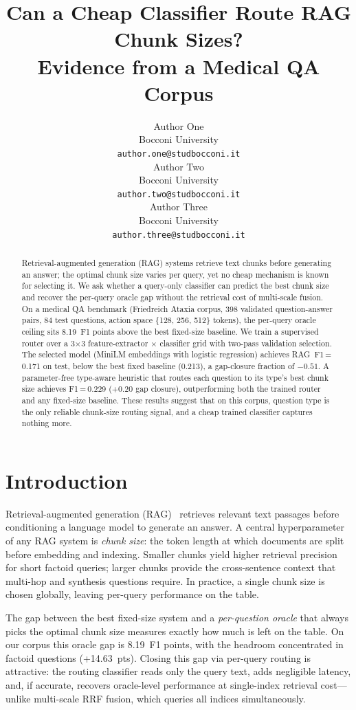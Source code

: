 \documentclass{article}
\title{Can a Cheap Classifier Route RAG Chunk Sizes?\\
       Evidence from a Medical QA Corpus}
\author{%
  Author One \\
  Bocconi University \\
  \texttt{author.one@studbocconi.it} \\
  \And
  Author Two \\
  Bocconi University \\
  \texttt{author.two@studbocconi.it} \\
  \And
  Author Three \\
  Bocconi University \\
  \texttt{author.three@studbocconi.it} \\
}
\begin{document}
\maketitle

\begin{abstract}
Retrieval-augmented generation (RAG) systems retrieve text chunks before
generating an answer; the optimal chunk size varies per query, yet no cheap
mechanism is known for selecting it. We ask whether a query-only classifier
can predict the best chunk size and recover the per-query oracle gap without
the retrieval cost of multi-scale fusion. On a medical QA benchmark
(Friedreich Ataxia corpus, 398 validated question-answer pairs, 84 test
questions, action space \{128, 256, 512\} tokens), the per-query oracle
ceiling sits 8.19~F1 points above the best fixed-size baseline. We train a
supervised router over a 3$\times$3 feature-extractor $\times$ classifier
grid with two-pass validation selection. The selected model (MiniLM
embeddings with logistic regression) achieves RAG~F1\,=\,0.171 on test,
below the best fixed baseline (0.213), a gap-closure fraction of $-0.51$.
A parameter-free type-aware heuristic that routes each question to its
type's best chunk size achieves F1\,=\,0.229 (+0.20 gap closure),
outperforming both the trained router and any fixed-size baseline. These
results suggest that on this corpus, question type is the only reliable
chunk-size routing signal, and a cheap trained classifier captures nothing
more.
\end{abstract}

\section{Introduction}

Retrieval-augmented generation (RAG)~\cite{lewis2020rag} retrieves relevant
text passages before conditioning a language model to generate an answer.
A central hyperparameter of any RAG system is \emph{chunk size}: the token
length at which documents are split before embedding and indexing. Smaller
chunks yield higher retrieval precision for short factoid queries; larger
chunks provide the cross-sentence context that multi-hop and synthesis
questions require. In practice, a single chunk size is chosen globally,
leaving per-query performance on the table.

The gap between the best fixed-size system and a \emph{per-question oracle}
that always picks the optimal chunk size measures exactly how much is left
on the table. On our corpus this oracle gap is 8.19~F1 points, with the
headroom concentrated in factoid questions (+14.63~pts). Closing this gap
via per-query routing is attractive: the routing classifier reads only the
query text, adds negligible latency, and, if accurate, recovers oracle-level
performance at single-index retrieval cost---unlike multi-scale RRF fusion,
which queries all indices simultaneously.
\end{document}
